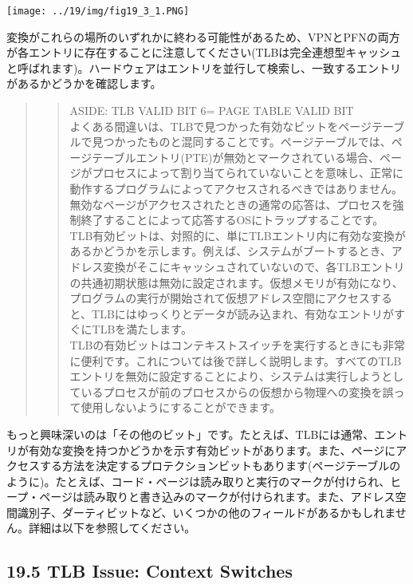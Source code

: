 \texttt{[image: ../19/img/fig19\_3\_1.PNG]}

変換がこれらの場所のいずれかに終わる可能性があるため、VPNとPFNの両方が各エントリに存在することに注意してください(TLBは完全連想型キャッシュと呼ばれます)。ハードウェアはエントリを並行して検索し、一致するエントリがあるかどうかを確認します。

\begin{quote}
\begin{quote}
ASIDE: TLB VALID BIT 6= PAGE TABLE VALID BIT\\
よくある間違いは、TLBで見つかった有効なビットをページテーブルで見つかったものと混同することです。ページテーブルでは、ページテーブルエントリ(PTE)が無効とマークされている場合、ページがプロセスによって割り当てられていないことを意味し、正常に動作するプログラムによってアクセスされるべきではありません。無効なページがアクセスされたときの通常の応答は、プロセスを強制終了することによって応答するOSにトラップすることです。\\
TLB有効ビットは、対照的に、単にTLBエントリ内に有効な変換があるかどうかを示します。例えば、システムがブートするとき、アドレス変換がそこにキャッシュされていないので、各TLBエントリの共通初期状態は無効に設定されます。仮想メモリが有効になり、プログラムの実行が開始されて仮想アドレス空間にアクセスすると、TLBにはゆっくりとデータが読み込まれ、有効なエントリがすぐにTLBを満たします。\\
TLBの有効ビットはコンテキストスイッチを実行するときにも非常に便利です。これについては後で詳しく説明します。すべてのTLBエントリを無効に設定することにより、システムは実行しようとしているプロセスが前のプロセスからの仮想から物理への変換を誤って使用しないようにすることができます。
\end{quote}
\end{quote}

もっと興味深いのは「その他のビット」です。たとえば、TLBには通常、エントリが有効な変換を持つかどうかを示す有効ビットがあります。また、ページにアクセスする方法を決定するプロテクションビットもあります(ページテーブルのように)。たとえば、コード・ページは読み取りと実行のマークが付けられ、ヒープ・ページは読み取りと書き込みのマークが付けられます。また、アドレス空間識別子、ダーティビットなど、いくつかの他のフィールドがあるかもしれません。詳細は以下を参照してください。

\hypertarget{tlb-issue-context-switches}{%
\subsection*{19.5 TLB Issue: Context
Switches}\label{tlb-issue-context-switches}}

